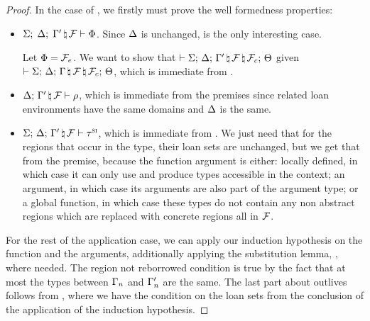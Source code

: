 \begin{proof}
  In the case of , we firstly must prove the well formedness
  properties:
  \begin{itemize}
  \item
    $\Sigma; \; \Delta; \; \Gamma^\prime \, \natural \, \mathcal{F} \vdash \Phi$.
    Since $\Delta$ is unchanged,  is the only interesting
    case.
    
    \vspace{1em}
    \noindent \hspace{-2.5em}  \vspace{1em}

    Let $\Phi = \mathcal{F}_e$. We want to show that
    $\vdash \Sigma; \, \Delta; \, \Gamma^\prime \, \natural \, \mathcal{F} \, \natural \, \mathcal{F}_c; \, \Theta$
    given
    $\vdash \Sigma; \, \Delta; \, \Gamma \, \natural \, \mathcal{F} \, \natural \, \mathcal{F}_c; \, \Theta$,
    which is immediate from .
  \item $\Delta; \, \Gamma^\prime \, \natural \, \mathcal{F} \vdash \rho$, which is immediate from
    the premises since related loan environments have the same domains and
    $\Delta$ is the same.
  \item $\Sigma; \, \Delta; \, \Gamma^\prime \, \natural \, \mathcal{F} \vdash \tau^\textsc{si}$, which is immediate
    from . We just need that for the regions that
    occur in the type, their loan sets are unchanged, but we get that from the
    premise, because the function argument is either: locally defined, in which
    case it can only use and produce types accessible in the context; an
    argument, in which case its arguments are also part of the argument type; or
    a global function, in which case these types do not contain any non abstract
    regions which are replaced with concrete regions all in $\mathcal{F}$.
  \end{itemize}

  For the rest of the application case, we can apply our induction hypothesis on
  the function and the arguments, additionally applying the substitution lemma,
  , where needed. The region not reborrowed condition
  is true by the fact that at most the types between $\Gamma_n$ and
  $\Gamma_n^\prime$ are the same. The last part about outlives follows from
  , where we have the condition on the loan sets
  from the conclusion of the application of the induction hypothesis.


\end{proof}

